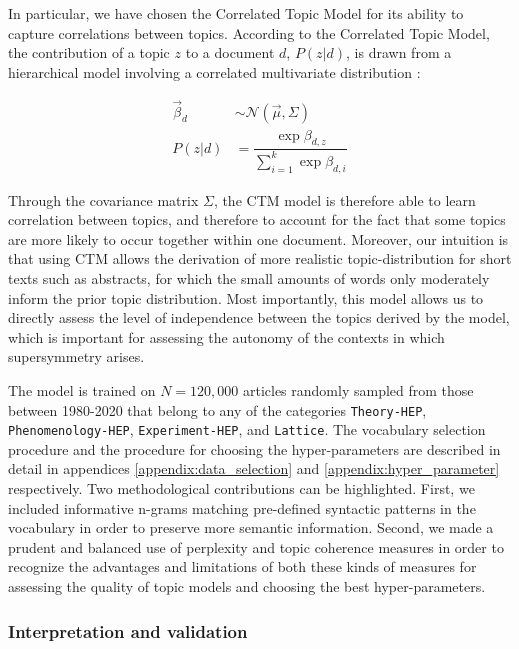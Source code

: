 \documentclass[smallextended]{svjour3}
\begin{document}
In particular, we have chosen the Correlated Topic Model for its ability to capture correlations between topics. According to the Correlated Topic Model, the contribution of a topic $z$ to a document $d$, $P(z|d)$, is drawn from a hierarchical model involving a correlated multivariate distribution \citep{Blei2007}:%

\begin{align}
    \label{eq:ctm_prior}
    \vec{\beta}_{d} &\sim \mathcal{N}(\vec{\mu}, \Sigma) \\
    P(z|d) &= \dfrac{\exp \beta_{d,z}}{\sum_{i=1}^k \exp \beta_{d,i}}
\end{align}

Through the covariance matrix $\Sigma$, the CTM model is therefore able to learn correlation between topics, and therefore to account for the fact that some topics are more likely to occur together within one document. Moreover, our intuition is that using CTM allows the derivation of more realistic topic-distribution for short texts such as abstracts, for which the small amounts of words only moderately inform the prior topic distribution. Most importantly, this model allows us to directly assess the level of independence between the topics derived by the model, which is important for assessing the autonomy of the contexts in which supersymmetry arises.

The model is trained on $N=120,000$ articles randomly sampled from those between 1980-2020 that belong to any of the categories \texttt{Theory-HEP}, \texttt{Phenomenology-HEP}, \texttt{Experiment-HEP}, and \texttt{Lattice}. The vocabulary selection procedure and the procedure for choosing the hyper-parameters are described in detail in appendices \ref{appendix:data_selection} and \ref{appendix:hyper_parameter} respectively. Two methodological contributions can be highlighted. First, we included informative n-grams matching pre-defined syntactic patterns in the vocabulary in order to preserve more semantic information. Second, we made a prudent and balanced use of perplexity and topic coherence measures in order to recognize the advantages and limitations of both these kinds of measures for assessing the quality of topic models and choosing the best hyper-parameters.

\subsubsection{Interpretation and validation}
\end{document}
